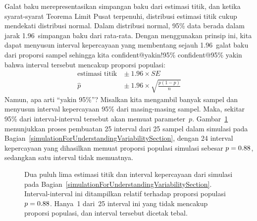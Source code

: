 Galat baku merepresentasikan simpangan baku
dari estimasi titik, dan ketika syarat-syarat Teorema
Limit Pusat terpenuhi,
distribusi estimasi titik cukup mendekati distribusi normal.
Dalam distribusi normal, 95\% data berada dalam jarak
1.96~simpangan baku dari rata-rata.
Dengan menggunakan prinsip ini, kita dapat menyusun interval kepercayaan
yang membentang sejauh 1.96~galat baku dari proporsi sampel
sehingga kita 
    {confident@yakin!95\% confident@95\% yakin}
bahwa interval tersebut mencakup proporsi populasi:
\begin{align*}
\text{estimasi titik}\ &\pm\ 1.96 \times SE \\
\hat{p}\ &\pm\ 1.96 \times \sqrt{\frac{p (1 - p)}{n}}
\end{align*}
Namun, apa arti ``yakin 95\%''? Misalkan kita mengambil
banyak sampel dan menyusun interval kepercayaan 95\% dari
masing-masing sampel. Maka, sekitar 95\% dari interval-interval tersebut akan
memuat parameter~$p$.
Gambar~\ref{95PercentConfidenceInterval} menunjukkan
proses pembuatan 25 interval dari 25 sampel
dalam simulasi pada
Bagian~\ref{simulationForUnderstandingVariabilitySection},
dengan 24 interval kepercayaan yang dihasilkan memuat
proporsi populasi simulasi sebesar
$p = 0.88{}$, sedangkan satu interval tidak memuatnya.


\begin{figure}
  \centering
  \caption{Dua puluh lima estimasi titik dan interval kepercayaan
      dari simulasi pada
      Bagian~\ref{simulationForUnderstandingVariabilitySection}.
      Interval-interval ini ditampilkan relatif terhadap proporsi
      populasi $p = 0.88{}$.
      Hanya~1 dari~25 interval ini
      yang tidak mencakup proporsi
      populasi, dan interval tersebut dicetak tebal.}
  \label{95PercentConfidenceInterval}
\end{figure}


